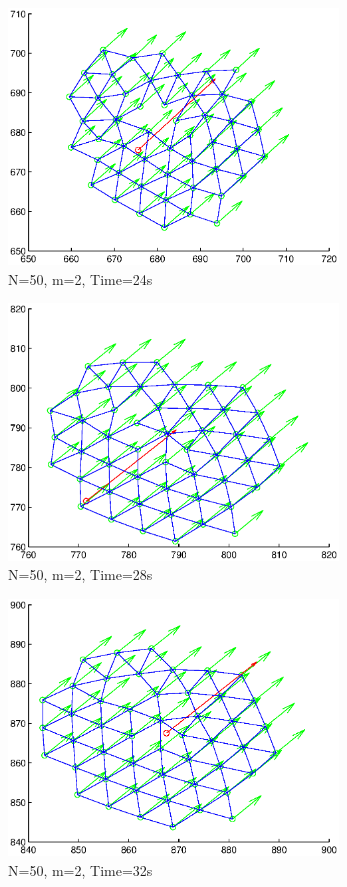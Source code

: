 \documentclass[10pt, conference]{IEEEtran}
\begin{document}
\begin{figure}[!p]
  \begin{center}
    \includegraphics[width=3.45in]{n50m2t24}
  \end{center}

  \caption{\small N=50, m=2, Time=24s}
  \label{fig:n50m2t24}
\end{figure}

\begin{figure}[!p]
  \begin{center}
    \includegraphics[width=3.45in]{n50m2t28}
  \end{center}

  \caption{\small N=50, m=2, Time=28s}
  \label{fig:n50m2t28}
\end{figure}

\begin{figure}[!p]
  \begin{center}
    \includegraphics[width=3.45in]{n50m2t32}
  \end{center}

  \caption{\small N=50, m=2, Time=32s}
  \label{fig:n50m2t32}
\end{figure}
\end{document}
